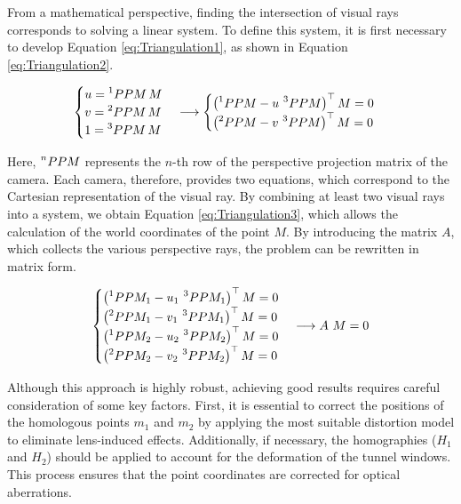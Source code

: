 From a mathematical perspective, finding the intersection of visual rays corresponds to solving a linear system.  
To define this system, it is first necessary to develop Equation \ref{eq:Triangulation1}, as shown in Equation \ref{eq:Triangulation2}.

\begin{equation}
  \begin{cases}
    u = \prescript{1}{}{PPM} \, M \\
    v = \prescript{2}{}{PPM} \, M \\
    1 = \prescript{3}{}{PPM} \, M \\
  \end{cases}
  \longrightarrow
  \begin{cases}
    \left( \prescript{1}{}{PPM} - u \, \prescript{3}{}{PPM} \right)^\top M = 0 \\
    \left( \prescript{2}{}{PPM} - v \, \prescript{3}{}{PPM} \right)^\top M = 0 \\
  \end{cases}
  \label{eq:Triangulation2}
\end{equation}

Here, $\prescript{n}{}{PPM}$ represents the \(n\)-th row of the perspective projection matrix of the camera.  
Each camera, therefore, provides two equations, which correspond to the Cartesian representation of the visual ray.  
By combining at least two visual rays into a system, we obtain Equation \ref{eq:Triangulation3}, which allows the calculation of the world coordinates of the point $M$.  
By introducing the matrix $A$, which collects the various perspective rays, the problem can be rewritten in matrix form.

\begin{equation}
  \begin{cases}
    \left( \prescript{1}{}{PPM_1} - u_1 \, \prescript{3}{}{PPM_1} \right)^\top M = 0 \\
    \left( \prescript{2}{}{PPM_1} - v_1 \, \prescript{3}{}{PPM_1} \right)^\top M = 0 \\
    \left( \prescript{1}{}{PPM_2} - u_2 \, \prescript{3}{}{PPM_2} \right)^\top M = 0 \\
    \left( \prescript{2}{}{PPM_2} - v_2 \, \prescript{3}{}{PPM_2} \right)^\top M = 0 \\
  \end{cases}
  \longrightarrow
  A \ M = 0
  \label{eq:Triangulation3}
\end{equation}

Although this approach is highly robust, achieving good results requires careful consideration of some key factors. First, it is essential to correct the positions of the homologous points $m_1$ and $m_2$ by applying the most suitable distortion model to eliminate lens-induced effects. Additionally, if necessary, the homographies ($H_1$ and $H_2$) should be applied to account for the deformation of the tunnel windows. This process ensures that the point coordinates are corrected for optical aberrations. 

